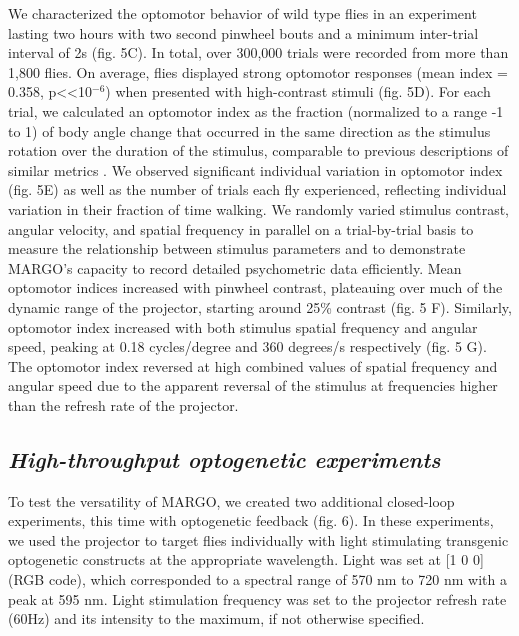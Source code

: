 \documentclass[10pt]{article}
\begin{document}
\begin{multicols}{2}
We characterized the optomotor behavior of wild type flies in an experiment lasting two hours with two second pinwheel bouts and a minimum inter-trial interval of 2s (fig. 5C). In total, over 300,000 trials were recorded from more than 1,800 flies. On average, flies displayed strong optomotor responses (mean index = 0.358, p<<10$^{-6}$) when presented with high-contrast stimuli (fig. 5D). For each trial, we calculated an optomotor index as the fraction (normalized to a range -1 to 1) of body angle change that occurred in the same direction as the stimulus rotation over the duration of the stimulus, comparable to previous descriptions of similar metrics \cite{Seelig_Two_2010}. We observed significant individual variation in optomotor index (fig. 5E) as well as the number of trials each fly experienced, reflecting individual variation in their fraction of time walking. We randomly varied stimulus contrast, angular velocity, and spatial frequency in parallel on a trial-by-trial basis to measure the relationship between stimulus parameters and to demonstrate MARGO's capacity to record detailed psychometric data efficiently. Mean optomotor indices increased with pinwheel contrast, plateauing over much of the dynamic range of the projector, starting around 25\% contrast (fig. 5 F). Similarly, optomotor index increased with both stimulus spatial frequency and angular speed, peaking at 0.18 cycles/degree and 360 degrees/s respectively (fig. 5 G). The optomotor index reversed at high combined values of spatial frequency and angular speed due to the apparent reversal of the stimulus at frequencies higher than the refresh rate of the projector.

\subsection*{\textit{High-throughput optogenetic experiments}}

To test the versatility of MARGO, we created two additional closed-loop experiments, this time with optogenetic feedback (fig. 6). In these experiments, we used the projector to target flies individually with light stimulating transgenic optogenetic constructs at the appropriate wavelength. Light was set at [1 0 0] (RGB code), which corresponded to a spectral range of 570 nm to 720 nm with a peak at 595 nm. Light stimulation frequency was set to the projector refresh rate (60Hz) and its intensity to the maximum, if not otherwise specified.


\end{multicols}
\end{document}
